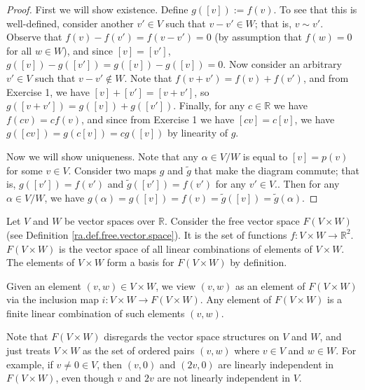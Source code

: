 \begin{proof}

First we will show existence. Define \(g([v]) := f(v)\). To see that this is well-defined, consider another \(v' \in V\) such that \(v - v' \in W\); that is, \(v \sim v'\). Observe that \( f(v) - f(v') = f(v - v') = 0\) (by assumption that \(f(w) = 0\) for all \(w \in W\)), and since \([v] = [v']\), \(g([v]) - g([v']) = g([v]) - g([v]) =0\). Now consider an arbitrary \(v' \in V\) such that \(v - v' \notin W\). Note that \(f(v + v') = f(v) + f(v')\), and from Exercise 1, we have \([v] + [v'] = [v + v']\), so \(g([v + v']) = g([v]) + g([v'])\). Finally, for any \(c \in \mathbb{R}\) we have \(f(cv) = c f(v)\), and since from Exercise 1 we have \([cv]= c[v]\), we have \(g([cv]) = g(c[v]) = cg([v])\) by linearity of \(g\).

Now we will show uniqueness. Note that any \(\alpha \in V/W\) is equal to \([v] = p(v)\) for some \(v \in V\). Consider two maps \(g\) and \(\tilde{g}\) that make the diagram commute; that is, \(g([v']) = f(v')\) and \(\tilde{g}([v']) = f(v')\) for any \(v' \in V\).. Then for any \(\alpha \in V/W\), we have \(g(\alpha) = g([v]) = f(v) = \tilde{g}([v]) =\tilde{g}(\alpha)\). 

\end{proof}

Let \(V\) and \(W\) be vector spaces over \(\mathbb{R}\). Consider the free vector space \(F(V \times W)\) (see Definition \ref{ra.def.free.vector.space}). It is the set of functions \(f: V \times W \to \mathbb{R}^2 \). \(F(V \times W)\) is the vector space of all linear combinations of elements of \(V \times W\). The elements of \(V \times W\) form a basis for \(F(V \times W)\) by definition.

Given an element \((v,w) \in V \times W\), we view \((v,w)\) as an element of \(F(V \times W)\) via the inclusion map \(i: V \times W \to F(V \times W)\). Any element of \(F(V \times W)\) is a finite linear combination of such elements \((v,w)\).

Note that \(F(V \times W)\) disregards the vector space structures on \(V \) and \(W\), and just treats \(V \times W\) as the set of ordered pairs \((v,w)\) where \(v \in V\) and \(w \in W\). For example, if \(v \neq 0 \in V\), then \((v, 0)\) and \((2v, 0)\) are linearly independent in \(F(V \times W)\), even though \(v\) and \(2v\) are not linearly independent in \(V\).

